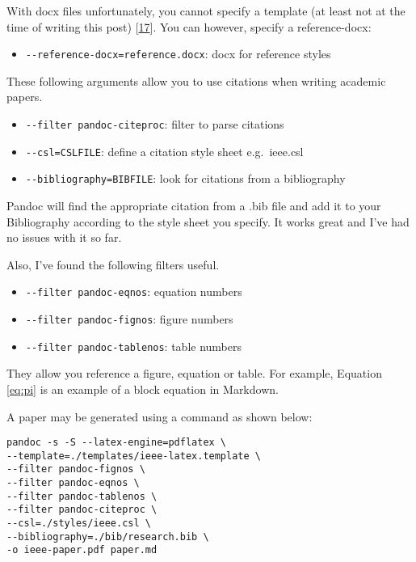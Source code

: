 \documentclass[journal,]{IEEEtran}
\providecommand{\tightlist}{%
  \setlength{\itemsep}{0pt}\setlength{\parskip}{0pt}}
\newcounter{figno}
\newcounter{tableno}
\begin{document}
With docx files unfortunately, you cannot specify a template (at least
not at the time of writing this post)
{[}\protect\hyperlink{ref-noauthor_googlegroups_nodate}{17}{]}. You can
however, specify a reference-docx:

\begin{itemize}
\tightlist
\item
  \texttt{-\/-reference-docx=reference.docx}: docx for reference styles
\end{itemize}

These following arguments allow you to use citations when writing
academic papers.

\begin{itemize}
\tightlist
\item
  \texttt{-\/-filter\ pandoc-citeproc}: filter to parse citations
\item
  \texttt{-\/-csl=CSLFILE}: define a citation style sheet e.g.~ieee.csl
\item
  \texttt{-\/-bibliography=BIBFILE}: look for citations from a
  bibliography
\end{itemize}

Pandoc will find the appropriate citation from a .bib file and add it to
your Bibliography according to the style sheet you specify. It works
great and I've had no issues with it so far.

Also, I've found the following filters useful.

\begin{itemize}
\tightlist
\item
  \texttt{-\/-filter\ pandoc-eqnos}: equation numbers
\item
  \texttt{-\/-filter\ pandoc-fignos}: figure numbers
\item
  \texttt{-\/-filter\ pandoc-tablenos}: table numbers
\end{itemize}

They allow you reference a figure, equation or table. For example,
Equation \ref{eq:pi} is an example of a block equation in Markdown.

A paper may be generated using a command as shown below:

\begin{verbatim}
pandoc -s -S --latex-engine=pdflatex \
--template=./templates/ieee-latex.template \
--filter pandoc-fignos \
--filter pandoc-eqnos \
--filter pandoc-tablenos \
--filter pandoc-citeproc \
--csl=./styles/ieee.csl \
--bibliography=./bib/research.bib \
-o ieee-paper.pdf paper.md
\end{verbatim}
\end{document}
